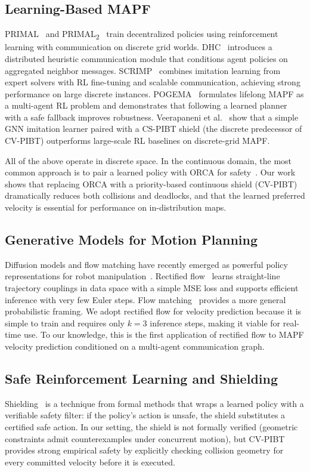\subsection{Learning-Based MAPF}

PRIMAL~\cite{sartoretti2019primal} and PRIMAL\textsubscript{2}~\cite{damani2021primal2} train decentralized policies using reinforcement learning with communication on discrete grid worlds. DHC~\cite{ma2021dhc} introduces a distributed heuristic communication module that conditions agent policies on aggregated neighbor messages. SCRIMP~\cite{wang2023scrimp} combines imitation learning from expert solvers with RL fine-tuning and scalable communication, achieving strong performance on large discrete instances. POGEMA~\cite{skrynnik2024pogema} formulates lifelong MAPF as a multi-agent RL problem and demonstrates that following a learned planner with a safe fallback improves robustness. Veerapaneni et al.~\cite{veerapaneni2022worksmart} show that a simple GNN imitation learner paired with a CS-PIBT shield (the discrete predecessor of CV-PIBT) outperforms large-scale RL baselines on discrete-grid MAPF.

All of the above operate in discrete space. In the continuous domain, the most common approach is to pair a learned policy with ORCA for safety~\cite{hu2024graphmapf}. Our work shows that replacing ORCA with a priority-based continuous shield (CV-PIBT) dramatically reduces both collisions and deadlocks, and that the learned preferred velocity is essential for performance on in-distribution maps.

\subsection{Generative Models for Motion Planning}

Diffusion models and flow matching have recently emerged as powerful policy representations for robot manipulation~\cite{chi2023diffusionpolicy}. Rectified flow~\cite{liu2023rectifiedflow} learns straight-line trajectory couplings in data space with a simple MSE loss and supports efficient inference with very few Euler steps. Flow matching~\cite{lipman2023flowmatching} provides a more general probabilistic framing. We adopt rectified flow for velocity prediction because it is simple to train and requires only $k{=}3$ inference steps, making it viable for real-time use. To our knowledge, this is the first application of rectified flow to MAPF velocity prediction conditioned on a multi-agent communication graph.

\subsection{Safe Reinforcement Learning and Shielding}

Shielding~\cite{alshiekh2018shielding} is a technique from formal methods that wraps a learned policy with a verifiable safety filter: if the policy's action is unsafe, the shield substitutes a certified safe action. In our setting, the shield is not formally verified (geometric constraints admit counterexamples under concurrent motion), but CV-PIBT provides strong empirical safety by explicitly checking collision geometry for every committed velocity before it is executed.
